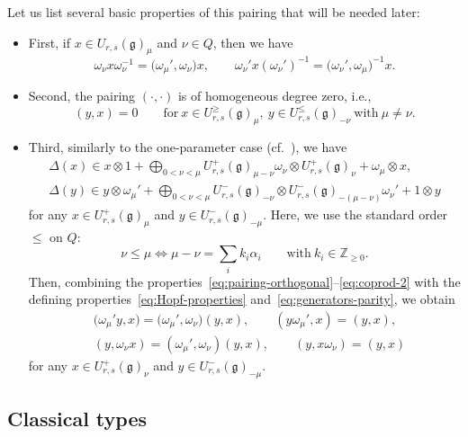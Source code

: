 \documentclass[pdftex]{sigma}
\numberwithin{equation}{section}
\newcommand{\fg}{\mathfrak{g}}
\newcommand{\BZ}{\mathbb{Z}}
\begin{document}
Let us list several basic properties of this pairing that will be needed later:
\begin{itemize}\itemsep=0pt
\item
First, if $x\in U_{r,s}(\fg)_{\mu}$ and $\nu\in Q$, then we have
\begin{displaymath}
 \omega_{\nu}x\omega_{\nu}^{-1} = \bigl(\omega_{\mu}',\omega_{\nu}\bigr)x, \qquad
 \omega_{\nu}'x(\omega_{\nu}')^{-1} = \bigl(\omega_{\nu}',\omega_{\mu}\bigr)^{-1}x.
\end{displaymath}

\item
Second, the pairing $(\cdot,\cdot)$ is of homogeneous degree zero, i.e.,
\begin{equation}\label{eq:pairing-orthogonal}
 (y,x)=0 \qquad \mathrm{for} \
 x\in U_{r,s}^{\ge}(\fg)_{\mu},\ y\in U_{r,s}^{\le}(\fg)_{-\nu}
 \ \mathrm{with} \ \mu\ne \nu.
\end{equation}

\item
Third, similarly to the one-parameter case (cf.\ \cite[Sections~6.14 and 6.15]{J}), we have
\begin{gather}\label{eq:coprod-1}
 \Delta(x) \in x\otimes 1 + \bigoplus_{0<\nu<\mu} U_{r,s}^{+}(\fg)_{\mu - \nu}\omega_{\nu} \otimes U_{r,s}^{+}(\fg)_{\nu} + \omega_{\mu} \otimes x,
\\ \label{eq:coprod-2}
 \Delta(y) \in y \otimes \omega_{\mu}' + \bigoplus_{0<\nu<\mu} U_{r,s}^{-}(\fg)_{-\nu} \otimes U_{r,s}^{-}(\fg)_{-(\mu - \nu)}\omega_{\nu}' + 1 \otimes y
\end{gather}
for any $x\in U_{r,s}^{+}(\fg)_{\mu}$ and $y \in U_{r,s}^{-}(\fg)_{-\mu}$. Here, we use the
standard order $\leq$ on $Q$:
\[
 \nu\leq \mu \Longleftrightarrow
 \mu-\nu=\sum_{i} k_i\alpha_i \qquad \mathrm{with} \ k_i\in \BZ_{\geq 0}.
\]
Then, combining the properties~\eqref{eq:pairing-orthogonal}--\eqref{eq:coprod-2} with the defining
properties~\eqref{eq:Hopf-properties} and~\eqref{eq:generators-parity}, we obtain
\begin{align*}
 & \bigl(\omega_{\mu}'y,x\bigr) = \bigl(\omega_{\mu}',\omega_{\nu}\bigr)(y,x), \qquad
 (y\omega_{\mu}',x) = (y,x), \\
 & (y,\omega_{\nu}x) = (\omega_{\mu}',\omega_{\nu})(y,x), \qquad
 (y,x\omega_{\nu}) = (y,x)
\end{align*}
for any $x\in U_{r,s}^{+}(\fg)_{\nu}$ and $y \in U_{r,s}^{-}(\fg)_{-\mu}$.
\end{itemize}

\subsection{Classical types}\label{ssec:classical-2param}
\end{document}
